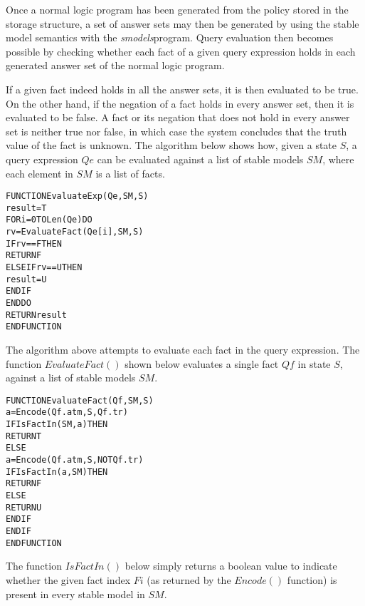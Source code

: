 \documentclass[global,twocolumn,final]{svjour}
\newenvironment{vverbatim}
  {\begin{alltt}}
  {\vspace{-\baselineskip}\end{alltt}}
\begin{document}
        Once a normal logic program has been generated from the policy stored
        in the storage structure, a set of answer sets may then be generated
        by using the stable model semantics \cite{SIM} with the
        {\em smodels}\footnotemark program. Query evaluation then becomes
        possible by checking whether each fact of a given query expression
        holds in each generated answer set of the normal logic program.


        If a given fact indeed holds in all the answer sets, it is then
        evaluated to be true. On the other hand, if the negation of a fact
        holds in every answer set, then it is evaluated to be false. A fact
        or its negation that does not hold in every answer set is neither true
        nor false, in which case the system concludes that the truth value of
        the fact is unknown. The algorithm below shows how, given a state $S$,
        a query expression $Qe$ can be evaluated against a list of stable
        models $SM$, where each element in $SM$ is a list of facts.

        \begin{vverbatim}
FUNCTION EvaluateExp(Qe, SM, S)
  result = T
  FOR i = 0 TO Len(Qe) DO
    rv = EvaluateFact(Qe[i], SM, S)
    IF rv == F THEN
      RETURN F
    ELSE IF rv == U THEN
      result = U
    ENDIF
  ENDDO
  RETURN result
ENDFUNCTION
        \end{vverbatim}

        The algorithm above attempts to evaluate each fact in the query
        expression. The function $EvaluateFact()$ shown below evaluates a
        single fact $Qf$ in state $S$, against a list of stable models $SM$.

        \begin{vverbatim}
FUNCTION EvaluateFact(Qf, SM, S)
  a = Encode(Qf.atm, S, Qf.tr)
  IF IsFactIn(SM, a) THEN
    RETURN T
  ELSE
    a = Encode(Qf.atm, S, NOT Qf.tr)
    IF IsFactIn(a, SM) THEN
      RETURN F
    ELSE
      RETURN U
    ENDIF
  ENDIF
ENDFUNCTION
        \end{vverbatim}

        The function $IsFactIn()$ below simply returns a boolean value to
        indicate whether the given fact index $Fi$ (as returned by the
        $Encode()$ function) is present in every stable model in $SM$.
\end{document}
